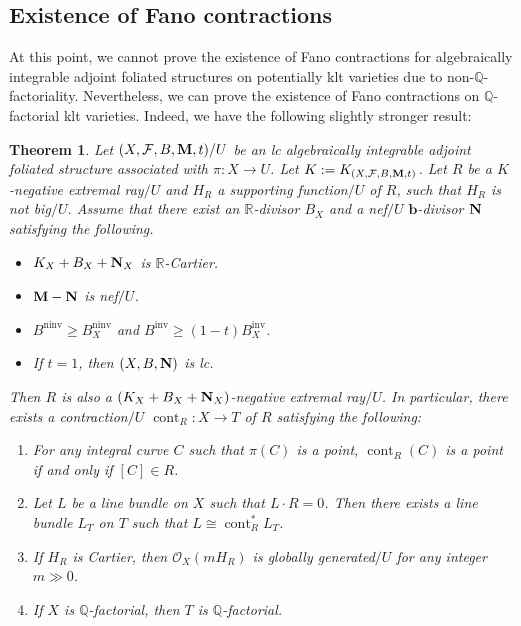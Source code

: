 \documentclass[12pt]{amsart}
\numberwithin{equation}{section}
\newcommand{\bb}{\bm{b}}
\newcommand{\Mm}{{\bf{M}}}
\newcommand{\Nn}{{\bf{N}}}
\newcommand{\Qq}{\mathbb{Q}}
\newcommand{\Rr}{\mathbb{R}}
\newcommand{\ninv}{\operatorname{ninv}}
\newcommand{\inv}{\operatorname{inv}}
\newcommand{\cont}{\operatorname{cont}}
\newcommand{\Ff}{\mathcal{F}}
\newtheorem{thm}{Theorem}[section]
\theoremstyle{definition}
\theoremstyle{definition}
\theoremstyle{definition}
\begin{document}
\subsection{Existence of Fano contractions}

At this point, we cannot prove the existence of Fano contractions for algebraically integrable adjoint foliated structures on potentially klt varieties due to non-$\Qq$-factoriality. Nevertheless, we can prove the existence of Fano contractions on $\Qq$-factorial klt varieties. Indeed, we have the following slightly stronger result:

\begin{thm}\label{thm: contraction not big}
Let  $(X,\Ff,B,\Mm,t)/U$ be an lc algebraically integrable adjoint foliated structure associated with $\pi: X\rightarrow U$. Let $K:=K_{(X,\Ff,B,\Mm,t)}$. Let $R$ be a $K$-negative extremal ray$/U$ and $H_R$ a supporting function$/U$ of $R$, such that $H_R$ is not big$/U$. Assume that there exist an $\Rr$-divisor $B_X$ and a nef$/U$ $\bb$-divisor $\Nn$ satisfying the following.
\begin{itemize}
    \item $K_X+B_X+\Nn_X$ is $\Rr$-Cartier.
    \item $\Mm-\Nn$ is nef$/U$.
    \item $B^{\ninv}\geq B_X^{\ninv}$ and $B^{\inv}\geq (1-t)B_X^{\inv}$.
    \item If $t=1$, then $(X,B,\Nn)$ is lc.
\end{itemize}
Then $R$ is also a $(K_X+B_X+\Nn_X)$-negative extremal ray$/U$. In particular,
there exists a contraction$/U$ $\cont_R: X\rightarrow T$ of $R$ satisfying the following:
\begin{enumerate}
    \item For any integral curve $C$ such that $\pi(C)$ is a point, $\cont_R(C)$ is a point if and only if $[C]\in R$.
    \item Let $L$ be a line bundle on $X$ such that $L\cdot R=0$. Then there exists a line bundle $L_T$ on $T$ such that $L\cong \cont_R^\ast L_T$.
    \item If $H_R$ is Cartier, then $\mathcal{O}_X(mH_R)$ is globally generated$/U$ for any integer $m\gg 0$.
    \item If $X$ is $\Qq$-factorial, then $T$ is $\Qq$-factorial.
\end{enumerate}
\end{thm}
\end{document}
